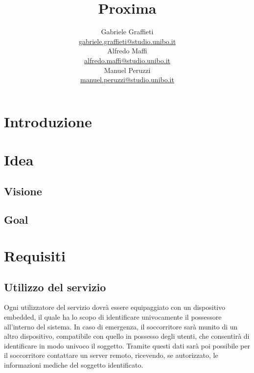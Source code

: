 \documentclass[a4paper,12pt]{report}
\title{\Huge \textbf{Proxima} \\
	\vspace{10pt}
	\vspace{20pt}
}
\author{
	Gabriele Graffieti \\ \small \url{gabriele.graffieti@studio.unibo.it}
	\vspace{15pt}
	\\
	Alfredo Maffi \\ \small \url{alfredo.maffi@studio.unibo.it}
	\vspace{15pt}
	\\
	Manuel Peruzzi \\ \small \url{manuel.peruzzi@studio.unibo.it}
}
\date{}
\begin{document}
\maketitle
{}


\tableofcontents

\chapter{Introduzione}

\chapter{Idea}
\section{Visione}
\section{Goal}
 
\chapter{Requisiti} 
\section{Utilizzo del servizio}
Ogni utilizzatore del servizio dovrà essere equipaggiato con un dispositivo embedded, il quale ha lo scopo di identificare univocamente il possessore all'interno del sistema. In caso di emergenza, il soccorritore sarà munito di un altro dispositivo, compatibile con quello in possesso degli utenti, che consentirà di identificare in modo univoco il soggetto. Tramite questi dati sarà poi possibile per il soccorritore contattare un server remoto, ricevendo, se autorizzato, le informazioni mediche del soggetto identificato. 
\end{document}
